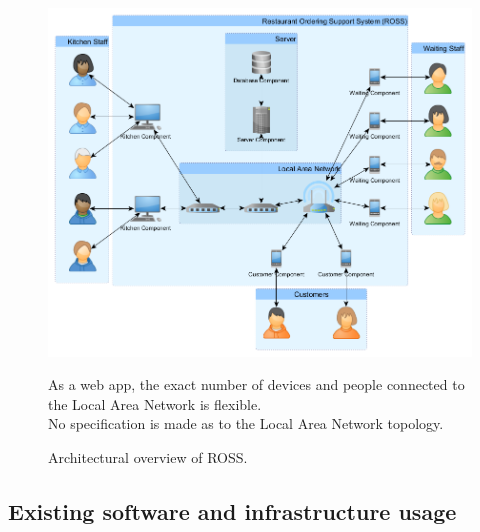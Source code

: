\documentclass[11pt, a4paper]{report}
\begin{document}
\begin{figure}[H]
\centering
\includegraphics[scale=0.5]{Figures/SystemArchitectureDiagram.png}
\caption{Architectural overview of ROSS.}
\vspace{1cm}
\flushleft
As a web app, the exact number of devices and people connected to the Local Area Network is flexible.\\
No specification is made as to the Local Area Network topology.
\end{figure}

\pagebreak

\subsection{Existing software and infrastructure usage}
\end{document}
